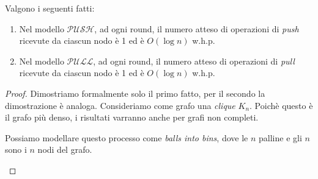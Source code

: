 \begin{lemma}
    Valgono i seguenti fatti:
    \begin{enumerate}
        \item Nel modello $\mathcal{PUSH}$, ad ogni round, il numero atteso di operazioni di \textit{push} ricevute da ciascun nodo è 1 ed è $O(\log n)$ w.h.p.
        \item Nel modello $\mathcal{PULL}$, ad ogni round, il numero atteso di operazioni di \textit{pull} ricevute da ciascun nodo è 1 ed è $O(\log n)$ w.h.p.
    \end{enumerate}
    \begin{proof}
        Dimostriamo formalmente solo il primo fatto, per il secondo la dimostrazione è analoga. Consideriamo come grafo una \textit{clique} $K_n$. Poichè questo è il grafo più denso, i risultati varranno anche per grafi non completi.

        Possiamo modellare questo processo come \textit{balls into bins}, dove le $n$ palline e gli $n$ sono i $n$ nodi del grafo.  
        
        \begin{center}
\end{center}
\end{proof}
\end{lemma}
